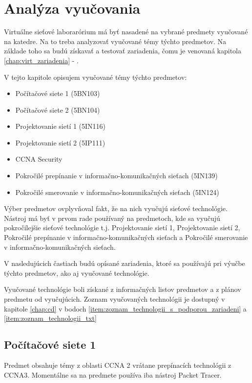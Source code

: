 \chapter{Analýza vyučovania}
\label{chap:analyza_vyucovania}

Virtuálne sieťové laborarórium má byť nasadené na vybrané predmety vyučované na katedre. Na to treba analyzovať vyučované témy týchto predmetov. Na základe toho sa budú získavať a testovať zariadenia, čomu je venovaná kapitola \ref{chap:virt_zariadenia} - .

V tejto kapitole opisujem vyučované témy týchto predmetov:
\begin{itemize}[noitemsep]
    \item Počítačové siete 1 (5BN103)
    \item Počítačové siete 2 (5BN104)
    \item Projektovanie sietí 1 (5IN116)
    \item Projektovanie sietí 2 (5IP111)
    \item CCNA Security
    \item Pokročilé prepínanie v informačno-komunikačných sieťach (5IN139)
    \item Pokročilé smerovanie v informačno-komunikačných sieťach (5IN124)
\end{itemize}

Výber predmetov ovplyvňoval fakt, že na nich vyučujú sieťové technológie. Nástroj má byť v prvom rade používaný na predmetoch, kde sa vyučujú pokročilejšie sieťové technológie t.j. Projektovanie sietí 1, Projektovanie sietí 2, Pokročilé prepínanie v informačno-komunikačných sieťach a Pokročilé smerovanie v informačno-komunikačných sieťach.

V nasledujúcich častiach budú opísané zariadenia, ktoré sa používajú pri výučbe týchto predmetov, ako aj vyučované technológie.

Vyučované technológie boli získané z informačných listov predmetov a z plánov predmetu od vyučujúcich. Zoznam vyučovaných technológii je dostupný v kapitole \ref{chap:cd} v bodoch \ref{item:zoznam_technologii_s_podporou_zariadeni} a \ref{item:zoznam_technologii_txt}




\section{Počítačové siete 1}

Predmet obsahuje témy z oblasti CCNA 2 vrátane prepínacích technológii z CCNA3. Momentálne sa na predmete používa iba nástroj Packet Tracer.

